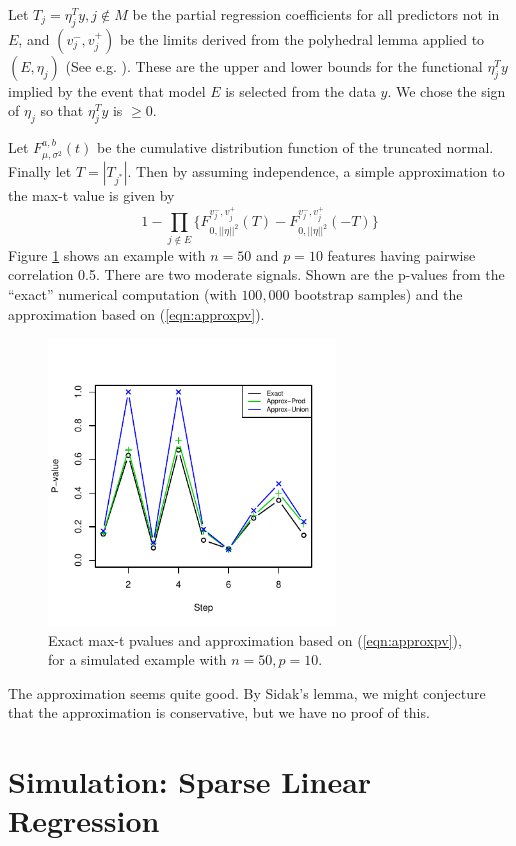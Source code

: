 \documentclass{article}
\begin{document}
Let $T_j=\eta_j^Ty, j \notin M$ be the partial regression coefficients for all predictors not in $E$,
and $(v_j^-, v_j^+)$ be the limits derived from the polyhedral lemma applied to $(E, \eta_j)$  (See e.g. \citet{spacings}).
These are the upper and lower bounds for the functional $\eta_j^Ty$ implied by the event that model $E$ is selected from the data $y$.
We chose the sign of $\eta_j$ so that $\eta_j^Ty$ is  $\geq 0$. 

 Let $F_{\mu,\sigma^2}^{a,b}(t)$ be the  cumulative distribution function of the truncated normal.
 Finally let $T=|T_{j^*}|$.
Then by assuming independence, a  simple approximation to the max-t value is given by
\begin{equation}
1-\prod_{j\notin E} \{F_{0,||\eta||^2}^{v_j^-, v_j^+}(T)-   F_{0,||\eta||^2}^{v_j^-, v_j^+}(-T) \}
\label{eqn:approxpv}
\end{equation}
Figure \ref{fig:approxpv} shows an example with $n=50$ and $p=10$ features having pairwise correlation 0.5.
There are two moderate signals.
Shown are the p-values from the ``exact'' numerical computation (with $100,000$ bootstrap samples)
and the approximation based on (\ref{eqn:approxpv}).
\begin{figure}[htp]
\centering
  \includegraphics[width=3in]{figs/approxpv.pdf}
  \caption{Exact max-t pvalues and approximation based on (\ref{eqn:approxpv}), for a simulated example
  with $n=50, p=10$.}
  \label{fig:approxpv}
\end{figure}
The approximation seems quite good. By Sidak's lemma, we might conjecture that the approximation is conservative, but we have no proof of this.

\section{Simulation: Sparse Linear Regression}\label{sec:sparseReg}
\end{document}
